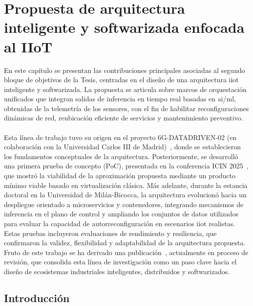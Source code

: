 \chapter{Propuesta de arquitectura inteligente y softwarizada enfocada al IIoT}
\label{ch:datadriven}

En este capítulo se presentan las contribuciones principales asociadas al segundo bloque de objetivos de la Tesis, centradas en el diseño de una arquitectura \gls{iiot} inteligente y softwarizada. La propuesta se articula sobre marcos de orquestación unificados que integran salidas de inferencia en tiempo real basadas en \gls{ai}/\gls{ml}, obtenidas de la telemetría de los sensores, con el fin de habilitar reconfiguraciones dinámicas de red, reubicación eficiente de servicios y mantenimiento preventivo.\\
\\
Esta línea de trabajo tuvo su origen en el proyecto 6G-DATADRIVEN‑02 (en colaboración con la Universidad Carlos III de Madrid)~\cite{6g-datadriven-arch}, donde se establecieron los fundamentos conceptuales de la arquitectura. Posteriormente, se desarrolló una primera prueba de concepto (PoC), presentada en la conferencia ICIN 2025~\cite{carrascal2025softwarized}, que mostró la viabilidad de la aproximación propuesta mediante un producto mínimo viable basado en virtualización clásica. Más adelante, durante la estancia doctoral en la Universidad de Milán-Bicocca, la arquitectura evolucionó hacia un despliegue orientado a microservicios y contenedores, integrando mecanismos de inferencia en el plano de control y ampliando los conjuntos de datos utilizados para evaluar la capacidad de autorreconfiguración en escenarios \gls{iiot} realistas. Estas pruebas incluyeron evaluaciones de rendimiento y resiliencia, que confirmaron la validez, flexibilidad y adaptabilidad de la arquitectura propuesta. Fruto de este trabajo se ha derivado una publicación~\cite{Carrascal2025milan}, actualmente en proceso de revisión, que consolida esta línea de investigación como un paso clave hacia el diseño de ecosistemas industriales inteligentes, distribuidos y softwarizados.

\section{Introducción}

